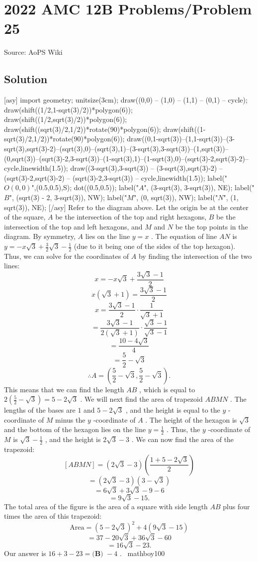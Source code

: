 \documentclass[12pt]{article}
\begin{document}
\section*{{2022 AMC 12B Problems/Problem 25}}
Source: AoPS Wiki

\subsection*{Solution}
[asy] import geometry; unitsize(3cm); draw((0,0) -- (1,0) -- (1,1) -- (0,1) -- cycle); draw(shift((1/2,1-sqrt(3)/2))*polygon(6)); draw(shift((1/2,sqrt(3)/2))*polygon(6)); draw(shift((sqrt(3)/2,1/2))*rotate(90)*polygon(6)); draw(shift((1-sqrt(3)/2,1/2))*rotate(90)*polygon(6)); draw((0,1-sqrt(3))--(1,1-sqrt(3))--(3-sqrt(3),sqrt(3)-2)--(sqrt(3),0)--(sqrt(3),1)--(3-sqrt(3),3-sqrt(3))--(1,sqrt(3))--(0,sqrt(3))--(sqrt(3)-2,3-sqrt(3))--(1-sqrt(3),1)--(1-sqrt(3),0)--(sqrt(3)-2,sqrt(3)-2)--cycle,linewidth(1.5)); draw((3-sqrt(3),3-sqrt(3)) -- (3-sqrt(3),sqrt(3)-2) -- (sqrt(3)-2,sqrt(3)-2) -- (sqrt(3)-2,3-sqrt(3)) -- cycle,linewidth(1.5)); label("$O (0, 0)$",(0.5,0.5),S); dot((0.5,0.5)); label("$A$", (3-sqrt(3), 3-sqrt(3)), NE); label("$B$", (sqrt(3) - 2, 3-sqrt(3)), NW); label("$M$", (0, sqrt(3)), NW); label("$N$", (1, sqrt(3)), NE); [/asy] Refer to the diagram above. Let the origin be at the center of the square, $A$ be the intersection of the top and right hexagons, $B$ be the intersection of the top and left hexagons, and $M$ and $N$ be the top points in the diagram. By symmetry, $A$ lies on the line $y = x$ . The equation of line $AN$ is $y = -x\sqrt{3} + \frac{3}{2}\sqrt{3} - \frac{1}{2}$ (due to it being one of the sides of the top hexagon). Thus, we can solve for the coordinates of $A$ by finding the intersection of the two lines: \[x = -x\sqrt{3} + \frac{3\sqrt{3} - 1}{2}\] \[x(\sqrt{3} + 1) = \frac{3\sqrt{3} - 1}{2}\] \[x = \frac{3\sqrt{3}-1}{2} \cdot \frac{1}{\sqrt{3} + 1}\] \[= \frac{3\sqrt{3}-1}{2(\sqrt{3} + 1)} \cdot \frac{\sqrt{3} - 1}{\sqrt{3} - 1}\] \[= \frac{10 - 4\sqrt{3}}{4}\] \[= \frac{5}{2} - \sqrt{3}\] \[\therefore A = \left(\frac{5}{2} - \sqrt{3}, \frac{5}{2} - \sqrt{3}\right).\] This means that we can find the length $AB$ , which is equal to $2(\frac{5}{2} - \sqrt{3}) = 5 - 2\sqrt{3}$ . We will next find the area of trapezoid $ABMN$ . The lengths of the bases are $1$ and $5 - 2\sqrt{3}$ , and the height is equal to the $y$ -coordinate of $M$ minus the $y$ -coordinate of $A$ . The height of the hexagon is $\sqrt{3}$ and the bottom of the hexagon lies on the line $y = \frac{1}{2}$ . Thus, the $y$ -coordinate of $M$ is $\sqrt{3} - \frac{1}{2}$ , and the height is $2\sqrt{3} - 3$ . We can now find the area of the trapezoid: \[[ABMN] = (2\sqrt{3} - 3)\left(\frac{1 + 5 - 2\sqrt{3}}{2}\right)\] \[= (2\sqrt{3} - 3)(3 - \sqrt{3})\] \[= 6\sqrt{3} + 3\sqrt{3} - 9 - 6\] \[= 9\sqrt{3} - 15.\] The total area of the figure is the area of a square with side length $AB$ plus four times the area of this trapezoid: \[\textrm{Area} = (5 - 2\sqrt{3})^2 + 4(9\sqrt{3} - 15)\] \[= 37 - 20\sqrt{3} + 36\sqrt{3} - 60\] \[= 16\sqrt{3} - 23.\] Our answer is $16 + 3 - 23 = \boxed{\textbf{(B) }-4}$ . ~mathboy100
\end{document}
